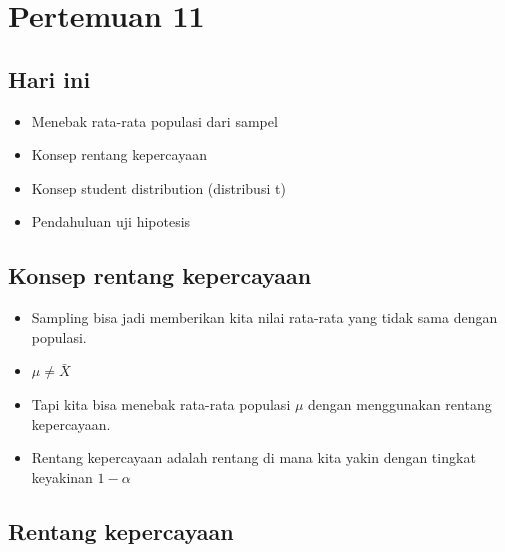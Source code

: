 \documentclass[
  letterpaper,
  DIV=11,
  numbers=noendperiod]{scrartcl}
\begin{document}
\hypertarget{pertemuan-11}{%
\section{Pertemuan 11}\label{pertemuan-11}}

\hypertarget{hari-ini-1}{%
\subsection{Hari ini}\label{hari-ini-1}}

\begin{itemize}
\item
  Menebak rata-rata populasi dari sampel
\item
  Konsep rentang kepercayaan
\item
  Konsep student distribution (distribusi t)
\item
  Pendahuluan uji hipotesis
\end{itemize}

\hypertarget{konsep-rentang-kepercayaan}{%
\subsection{Konsep rentang
kepercayaan}\label{konsep-rentang-kepercayaan}}

\begin{itemize}
\item
  Sampling bisa jadi memberikan kita nilai rata-rata yang tidak sama
  dengan populasi.
\item
  \(\mu \neq \bar{X}\)
\item
  Tapi kita bisa menebak rata-rata populasi \(\mu\) dengan menggunakan
  rentang kepercayaan.
\item
  Rentang kepercayaan adalah rentang di mana kita yakin dengan tingkat
  keyakinan \(1-\alpha\)
\end{itemize}

\hypertarget{rentang-kepercayaan}{%
\subsection{Rentang kepercayaan}\label{rentang-kepercayaan}}
\end{document}
